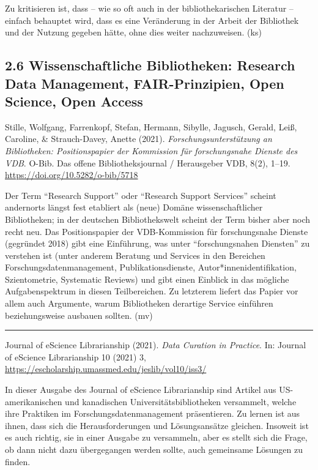\documentclass[a4paper,
fontsize=11pt,
oneside,
numbers=noperiodatend,
parskip=half-,
bibliography=totoc,
final
]{scrartcl}
\begin{document}
Zu kritisieren ist, dass -- wie so oft auch in der bibliothekarischen
Literatur -- einfach behauptet wird, dass es eine Veränderung in der
Arbeit der Bibliothek und der Nutzung gegeben hätte, ohne dies weiter
nachzuweisen. (ks)

\hypertarget{wissenschaftliche-bibliotheken-research-data-management-fair-prinzipien-open-science-open-access}{%
\subsection{2.6 Wissenschaftliche Bibliotheken: Research Data Management,
FAIR-Prinzipien, Open Science, Open
Access}\label{wissenschaftliche-bibliotheken-research-data-management-fair-prinzipien-open-science-open-access}}

Stille, Wolfgang, Farrenkopf, Stefan, Hermann, Sibylle, Jagusch, Gerald,
Leiß, Caroline, \& Strauch-Davey, Anette (2021).
\emph{Forschungsunterstützung an Bibliotheken: Positionspapier der
Kommission für forschungsnahe Dienste des VDB}. O-Bib. Das offene
Bibliotheksjournal / Herausgeber VDB, 8(2), 1--19.
\url{https://doi.org/10.5282/o-bib/5718}

Der Term \enquote{Research Support} oder \enquote{Research Support
Services} scheint andernorts längst fest etabliert als (neue) Domäne
wissenschaftlicher Bibliotheken; in der deutschen Bibliothekswelt
scheint der Term bisher aber noch recht neu. Das Positionspapier der
VDB-Kommission für forschungsnahe Dienste (gegründet 2018) gibt eine
Einführung, was unter \enquote{forschungsnahen Diensten} zu verstehen
ist (unter anderem Beratung und Services in den Bereichen
Forschungsdatenmanagement, Publikationsdienste,
Autor*innenidentifikation, Szientometrie, Systematic Reviews) und gibt
einen Einblick in das mögliche Aufgabenspektrum in diesen Teilbereichen.
Zu letzterem liefert das Papier vor allem auch Argumente, warum
Bibliotheken derartige Service einführen beziehungsweise ausbauen
sollten. (mv)

\begin{center}\rule{0.5\linewidth}{0.5pt}\end{center}

Journal of eScience Librarianship (2021). \emph{Data Curation in
Practice}. In: Journal of eScience Librarianship 10 (2021) 3,
\url{https://escholarship.umassmed.edu/jeslib/vol10/iss3/}

In dieser Ausgabe des Journal of eScience Librarianship sind Artikel aus
US-amerikanischen und kanadischen Universitätsbibliotheken versammelt,
welche ihre Praktiken im Forschungsdatenmanagement präsentieren. Zu
lernen ist aus ihnen, dass sich die Herausforderungen und Lösungsansätze
gleichen. Insoweit ist es auch richtig, sie in einer Ausgabe zu
versammeln, aber es stellt sich die Frage, ob dann nicht dazu
übergegangen werden sollte, auch gemeinsame Lösungen zu finden.
\end{document}
